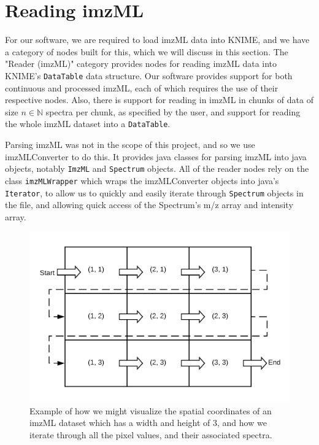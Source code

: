 \documentclass[11pt,openany]{book}
\begin{document}
\chapter{Reading imzML}
For our software, we are required to load imzML data into KNIME, and we have a category of nodes built for this, which we will discuss in this section.
The "Reader (imzML)" category provides nodes for reading imzML data into KNIME's \texttt{DataTable} data structure. Our software provides support for both continuous and processed imzML, each of which requires the use of their respective nodes. Also, there is support for reading in imzML in chunks of data of size $n \in \mathbb{N}$ spectra per chunk, as specified by the user, and support for reading the whole imzML dataset into a \texttt{DataTable}.

Parsing imzML was not in the scope of this project, and so we use imzMLConverter \cite{imzMLConverter_article} to do this. It provides java classes for parsing imzML into java objects, notably \texttt{ImzML} and \texttt{Spectrum} objects. All of the reader nodes rely on the class \texttt{imzMLWrapper} which wraps the imzMLConverter objects into java's \texttt{Iterator}, to allow us to quickly and easily iterate through \texttt{Spectrum} objects in the file, and allowing quick access of the Spectrum's m/z array and intensity array.

\begin{figure}[H]
    \centering
    \includegraphics[scale=0.2]{./images/imzMLReading.png}
    \caption{Example of how we might visualize the spatial coordinates of an imzML dataset which has a width and height of 3, and how we iterate through all the pixel values, and their associated spectra.}
    \label{fig:imzML_reading_visualization}
\end{figure}
\end{document}
